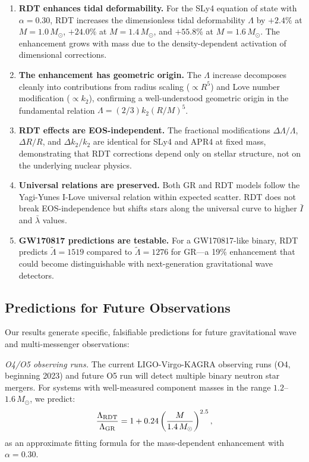 \documentclass[twocolumn,showpacs,preprintnumbers,amsmath,amssymb,prd]{revtex4-2}
\begin{document}
\begin{enumerate}

\item \textbf{RDT enhances tidal deformability.} For the SLy4 equation of state with $\alpha = 0.30$, RDT increases the dimensionless tidal deformability $\Lambda$ by $+2.4\%$ at $M = 1.0\,M_\odot$, $+24.0\%$ at $M = 1.4\,M_\odot$, and $+55.8\%$ at $M = 1.6\,M_\odot$. The enhancement grows with mass due to the density-dependent activation of dimensional corrections.

\item \textbf{The enhancement has geometric origin.} The $\Lambda$ increase decomposes cleanly into contributions from radius scaling ($\propto R^5$) and Love number modification ($\propto k_2$), confirming a well-understood geometric origin in the fundamental relation $\Lambda = (2/3)k_2(R/M)^5$.

\item \textbf{RDT effects are EOS-independent.} The fractional modifications $\Delta\Lambda/\Lambda$, $\Delta R/R$, and $\Delta k_2/k_2$ are identical for SLy4 and APR4 at fixed mass, demonstrating that RDT corrections depend only on stellar structure, not on the underlying nuclear physics.

\item \textbf{Universal relations are preserved.} Both GR and RDT models follow the Yagi-Yunes I-Love universal relation within expected scatter. RDT does not break EOS-independence but shifts stars along the universal curve to higher $\bar{I}$ and $\bar{\lambda}$ values.

\item \textbf{GW170817 predictions are testable.} For a GW170817-like binary, RDT predicts $\tilde{\Lambda} = 1519$ compared to $\tilde{\Lambda} = 1276$ for GR---a 19\% enhancement that could become distinguishable with next-generation gravitational wave detectors.

\end{enumerate}

\subsection{Predictions for Future Observations}
\label{sec:conclusions_predictions}

Our results generate specific, falsifiable predictions for future gravitational wave and multi-messenger observations:

\textit{O4/O5 observing runs.} The current LIGO-Virgo-KAGRA observing runs (O4, beginning 2023) and future O5 run will detect multiple binary neutron star mergers. For systems with well-measured component masses in the range $1.2$--$1.6\,M_\odot$, we predict:
\begin{equation}
\frac{\Lambda_{\rm RDT}}{\Lambda_{\rm GR}} = 1 + 0.24\left(\frac{M}{1.4\,M_\odot}\right)^{2.5},
\label{eq:prediction_ratio}
\end{equation}
as an approximate fitting formula for the mass-dependent enhancement with $\alpha = 0.30$.
\end{document}

